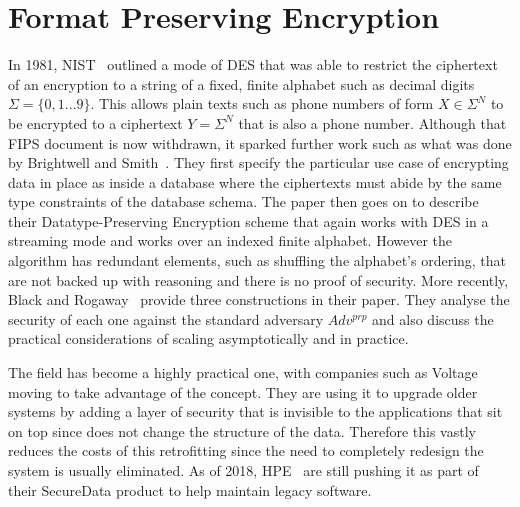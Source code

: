 \documentclass[ %
                    author={Samuel Russell},
                supervisor={Prof. Bogdan Warinschi},
                    degree={MEng},
                     title={Innocuous Ciphertexts},
                  subtitle={The DE-CENSOR Scheme},
                      type={research},
                      year={2018} ]{dissertation}
\begin{document}
\section{Format Preserving Encryption}

In 1981, NIST~\cite{FIPS74} outlined a mode of DES that was able to restrict the ciphertext of an encryption to a string of a fixed, finite alphabet such as decimal digits $ \Sigma = \{0,1...9\} $. This allows plain texts such as phone numbers of form $ X \in \Sigma^N $ to be encrypted to a ciphertext $ Y = \Sigma^N $ that is also a phone number. Although that FIPS document is now withdrawn, it sparked further work such as what was done by Brightwell and Smith~\cite{DPE}. They first specify the particular use case of encrypting data in place as inside a database where the ciphertexts must abide by the same type constraints of the database schema. The paper then goes on to describe their  Datatype-Preserving Encryption scheme that again works with DES in a streaming mode and works over an indexed finite alphabet. However the algorithm has redundant elements, such as shuffling the alphabet's ordering, that are not backed up with reasoning and there is no proof of security. More recently, Black and Rogaway~\cite{CAFD} provide three constructions in their paper. They analyse the security of each one against the standard adversary $Adv^{prp}$ and also discuss the practical considerations of scaling asymptotically and in practice.

The field has become a highly practical one, with companies such as Voltage moving to take advantage of the concept. They are using it to upgrade older systems by adding a layer of security that is invisible to the applications that sit on top since does not change the structure of the data. Therefore this vastly reduces the costs of this retrofitting since the need to completely redesign the system is usually eliminated. As of 2018, HPE~\cite{hp} are still pushing it as part of their SecureData product to help maintain legacy software.
\end{document}
